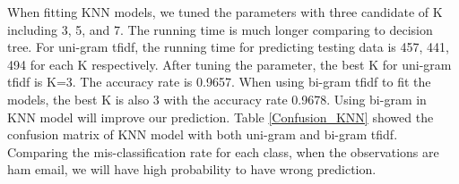 
When fitting KNN models, we tuned the parameters with three candidate of K including 3, 5, and 7. The running time is much longer comparing to decision tree. For uni-gram tfidf, the running time for predicting testing data is 457, 441, 494 for each K respectively. After tuning the parameter, the best K for uni-gram tfidf is K=3. The accuracy rate is 0.9657. When using bi-gram tfidf to fit the models, the best K is also 3 with the accuracy rate 0.9678. Using bi-gram in KNN model will improve our prediction. Table \ref{Confusion_KNN} showed the confusion matrix of KNN model with both uni-gram and bi-gram tfidf. Comparing the mis-classification rate for each class, when the observations are ham email, we will have high probability to have wrong prediction.\\

